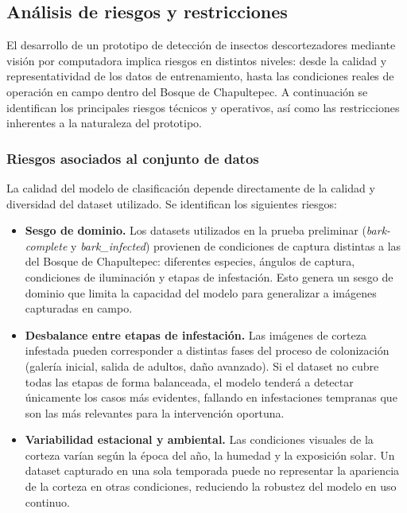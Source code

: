 \newpage
\subsection{Análisis de riesgos y restricciones}

El desarrollo de un prototipo de detección de insectos descortezadores mediante visión por computadora implica riesgos en distintos niveles: desde la calidad y representatividad de los datos de entrenamiento, hasta las condiciones reales de operación en campo dentro del Bosque
de Chapultepec. A continuación se identifican los principales riesgos técnicos y operativos, así como las restricciones inherentes a la naturaleza del prototipo.

\subsubsection{Riesgos asociados al conjunto de datos}

La calidad del modelo de clasificación depende directamente de la calidad y diversidad del dataset utilizado. Se identifican los siguientes riesgos:

\begin{itemize}
    \item \textbf{Sesgo de dominio.} Los datasets utilizados en la prueba preliminar (\textit{bark-complete} y \textit{bark\_infected}) provienen de condiciones de captura distintas a las del Bosque de Chapultepec: diferentes especies, ángulos de captura, condiciones de iluminación y etapas de infestación. Esto genera un sesgo de dominio
    que limita la capacidad del modelo para generalizar a imágenes capturadas en campo.

    \item \textbf{Desbalance entre etapas de infestación.} Las imágenes de corteza infestada pueden corresponder a distintas fases del proceso de colonización (galería inicial, salida
    de adultos, daño avanzado). Si el dataset no cubre todas las etapas de forma balanceada, el modelo tenderá a detectar únicamente los casos más evidentes, fallando en infestaciones tempranas que son las más relevantes para la intervención oportuna.

    \item \textbf{Variabilidad estacional y ambiental.} Las condiciones visuales de la corteza varían según la época del año, la humedad y la exposición solar. Un dataset capturado en una sola temporada puede no representar la apariencia de la corteza en otras condiciones, reduciendo la robustez del modelo en uso continuo.
\end{itemize}

